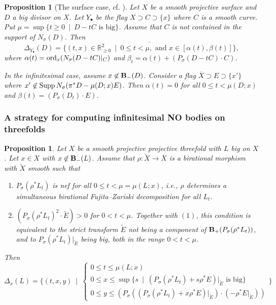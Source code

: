 \documentclass[12pt]{amsart}
\newtheorem{proposition}[lemma]{Proposition}
\theoremstyle{definition}
\newcommand{\bb}{\ensuremath{\mathfrak{b}}}
\renewcommand{\geq}{\geqslant}
\renewcommand{\leq}{\leqslant}
\newcommand{\?}{ \circled{{\large\bf ?}}}
\let\bb\mathbb
\begin{document}
\begin{proposition}[The surface case, cf. {\cite[Theorem 6.4]{LM09}} ]\label{prop:NOsurface}
	Let $X$ be a smooth projective surface and $D$ a big divisor on $X$.
	Let $Y_{\bullet}$ be the flag $X\supset C\supset\{x\}$ where $C$ is a smooth curve. Put $\mu=\sup\{t\geq 0\ \mid\ D-tC\text{ is big}\}$. Assume that $C$ is not contained in the support of $N_{\sigma}(D)$. Then
	\[\Delta_{Y_{\bullet}}(D)=\overline{\bigl\{(t,x)\in\bb R^2_{\geq 0}\ \mid\ 0\leq t<\mu,\text{ and }x\in[\alpha(t),\beta(t)]\bigr\}},\]
	where $\alpha(t)={\rm ord}_x(N_{\sigma}(D-tC)|_C)$ and $\beta_t=\alpha(t)+(P_{\sigma}(D-tC)\cdot C)$. 
	\smallskip
	
	In the infinitesimal case, assume $x\not\in{\bf B}_-(D)$. Consider a flag $\overline X\supset E\supset\{x'\}$ where $x'\not\in{\rm Supp}\, N_{\sigma}(\pi^*D-\mu(D;x) E)$. Then $\alpha(t)=0$ for all $0\leq t<\mu(D;x)$ and $\beta(t)=(P_\sigma(D_t)\cdot E)$.
\end{proposition}





\subsubsection{A strategy for computing infinitesimal NO bodies on threefolds}


\begin{proposition}\label{prop:iNOthreefold}
	Let $X$ be a smooth projective projective threefold with $L$ big on $X$. Let $x\in X$ with $x\not\in{\bf B}_-(L)$. Assume that $\rho:\widetilde X\to\overline X$ is a birational morphism with $\widetilde X$ smooth such that
	\begin{enumerate}
		\item $P_{\sigma}(\rho^*L_t)$ is nef for all $0\leq t<\mu=\mu(L;x)$, i.e., $\rho$ determines a simultaneous birational Fujita--Zariski decomposition for all $L_t$.
		\smallskip
		
		\item $(P_{\sigma}(\rho^*L_t)^2\cdot \widetilde E)>0$ for $0<t<\mu$. Together with $(1)$, this condition is equivalent to the strict transform $\widetilde E$ not being a component of ${\bf B}_+(P_{\sigma}(\rho^*L_t))$, and to $P_{\sigma}(\rho^*L_t)|_{\widetilde E}$ being big, both in the range $0<t<\mu$.
	\end{enumerate}
	Then
	\[\Delta_x(L)=\biggl\{(t,x,y)\ \mid\ \begin{cases}0\leq t\leq \mu(L;x)\\ 0\leq x\leq \sup\{s\ \mid\ (P_{\sigma}(\rho^*L_t)+s\rho^* E)|_{\widetilde E}\text{ is big}\}\\ 0\leq y\leq (P_{\sigma}((P_{\sigma}(\rho^*L_t)+x\rho^* E)|_{\widetilde E})\cdot(-\rho^* E|_{\widetilde E}))\end{cases}\biggr\}\]
\end{proposition}
\end{document}
